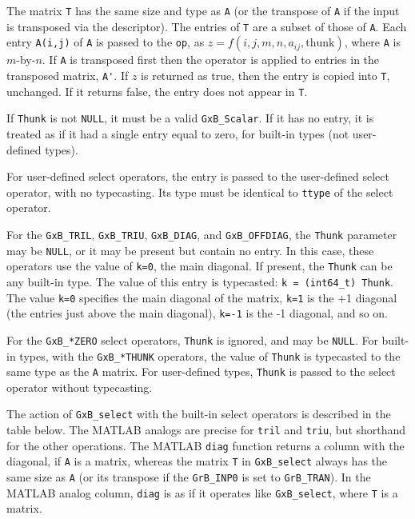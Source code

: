 \documentclass[12pt]{article}
\begin{document}
The matrix \verb'T' has the same size and type as \verb'A' (or the transpose of
\verb'A' if the input is transposed via the descriptor).  The entries of
\verb'T' are a subset of those of \verb'A'.  Each entry \verb'A(i,j)' of
\verb'A' is passed to the \verb'op', as $z=f(i,j,m,n,a_{ij},\mbox{thunk})$,
where \verb'A' is $m$-by-$n$.  If \verb'A' is transposed first then the
operator is applied to entries in the transposed matrix, \verb"A'".  If $z$ is
returned as true, then the entry is copied into \verb'T', unchanged.  If it
returns false, the entry does not appear in \verb'T'.

If \verb'Thunk' is not \verb'NULL', it must be a valid \verb'GxB_Scalar'.
If it has no entry, it is treated as if it had a single entry equal to zero,
for built-in types (not user-defined types).

For user-defined select operators, the entry
is passed to the user-defined select operator, with no typecasting.
Its type must be identical to  \verb'ttype' of the select operator.

For the \verb'GxB_TRIL', \verb'GxB_TRIU', \verb'GxB_DIAG', and
\verb'GxB_OFFDIAG', the \verb'Thunk' parameter may be \verb'NULL', or it may be
present but contain no entry.  In this case, these operators use the value of
\verb'k=0', the main diagonal.  If present, the \verb'Thunk' can be any
built-in type.  The value of this entry is typecasted:
\verb'k = (int64_t) Thunk'.  The value \verb'k=0' specifies the main
diagonal of the matrix, \verb'k=1' is the +1 diagonal (the entries just above
the main diagonal), \verb'k=-1' is the -1 diagonal, and so on.

For the \verb'GxB_*ZERO' select operators, \verb'Thunk' is ignored, and may be
\verb'NULL'.  For built-in types, with the \verb'GxB_*THUNK' operators, the
value of \verb'Thunk' is typecasted to the same type as the \verb'A' matrix.
For user-defined types, \verb'Thunk' is passed to the select operator without
typecasting.

The action of \verb'GxB_select' with the built-in select operators is described
in the table below.  The MATLAB analogs are precise for \verb'tril' and
\verb'triu', but shorthand for the other operations.  The MATLAB \verb'diag'
function returns a column with the diagonal, if \verb'A' is a matrix, whereas
the matrix \verb'T' in \verb'GxB_select' always has the same size as \verb'A'
(or its transpose if the \verb'GrB_INP0' is set to \verb'GrB_TRAN').  In the
MATLAB analog column, \verb'diag' is as if it operates like \verb'GxB_select',
where \verb'T' is a matrix.
\end{document}
